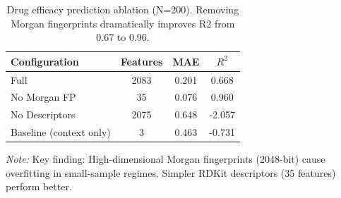 \begin{table}[htbp]
\centering
\caption{Drug efficacy prediction ablation (N=200). Removing Morgan fingerprints dramatically improves R2 from 0.67 to 0.96.}
\label{tab:drug_ablation}
\begin{tabular}{lccc}
\toprule
Configuration & Features & MAE & $R^2$ \\
\midrule
Full & 2083 & 0.201 & 0.668 \\
No Morgan FP & 35 & 0.076 & 0.960 \\
No Descriptors & 2075 & 0.648 & -2.057 \\
Baseline (context only) & 3 & 0.463 & -0.731 \\
\bottomrule
\end{tabular}
\footnotesize {\textit{Note:} Key finding: High-dimensional Morgan fingerprints (2048-bit) cause overfitting in small-sample regimes. Simpler RDKit descriptors (35 features) perform better.}
\end{table}
